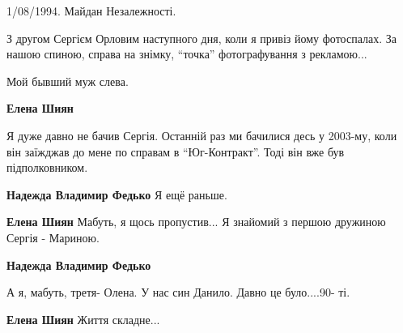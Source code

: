  
 
 
 
 

1/08/1994. Майдан Незалежності.

З другом Сергієм Орловим наступного дня, коли я привіз йому фотоспалах. За
нашою спиною, справа на знімку, \enquote{точка} фотографування з рекламою...

Мой бывший муж слева.

\textbf{Елена Шиян} 

Я дуже давно не бачив Сергія. Останній раз ми бачилися десь у 2003-му, коли він
заїжджав до мене по справам в \enquote{Юг-Контракт}. Тоді він вже був підполковником.

\textbf{Надежда Владимир Федько} Я ещё раньше.

\textbf{Елена Шиян} Мабуть, я щось пропустив... Я знайомий з першою дружиною Сергія - Мариною.

\textbf{Надежда Владимир Федько} 

А я, мабуть, третя- Олена. У нас син Данило. Давно це було....90- ті.

\textbf{Елена Шиян} Життя складне...

